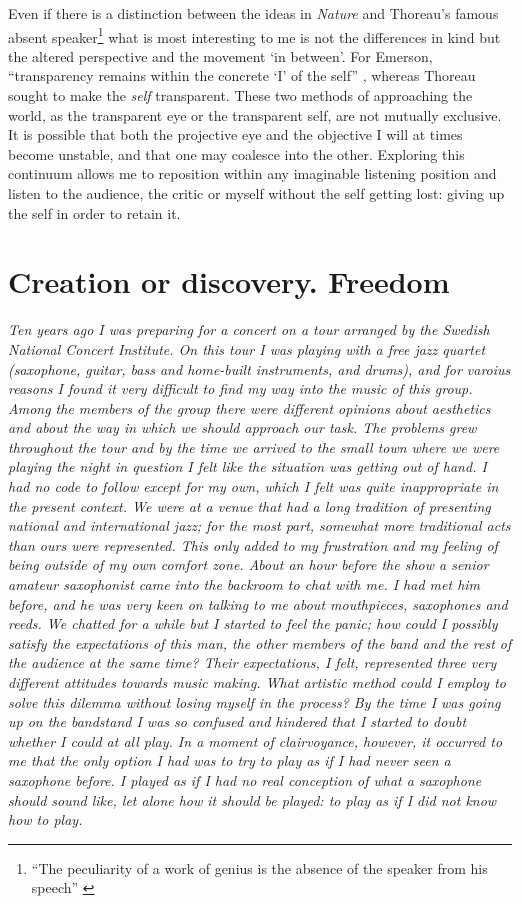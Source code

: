 \documentclass[a4paper]{article}
\begin{document}
Even if there is a distinction between the ideas in \emph{Nature} and Thoreau's famous absent speaker\footnote{``The peculiarity of a work of genius is the absence of the speaker from his speech'' \citep[][p. 264]{thoreau1891}} what is most interesting to me is not the differences in kind but the altered perspective and the movement `in between'. For Emerson, ``transparency remains within the concrete `I' of the self'' \citep[][p. 61]{shultis98}, whereas Thoreau sought to make the \emph{self} transparent. These two methods of approaching the world, as the transparent eye or the transparent self, are not mutually exclusive. It is possible that both the projective eye and the objective I will at times become unstable, and that one may coalesce into the other. Exploring this continuum allows me to reposition within any imaginable listening position and listen to the audience, the critic or myself without the self getting lost: giving up the self in order to retain it. 

\section*{Creation or discovery. Freedom}

\textit{Ten years ago I was preparing for a concert on a tour arranged by the Swedish National Concert Institute. On this tour I was playing with a free jazz quartet (saxophone, guitar, bass and home-built instruments, and drums), and for varoius reasons I found it very difficult to find my way into the music of this group. Among the members of the group there were different opinions about aesthetics and about the way in which we should approach our task. The problems grew throughout the tour and by the time we arrived to the small town where we were playing the night in question I felt like the situation was getting out of hand. I had no code to follow except for my own, which I felt was quite inappropriate in the present context. We were at a venue that had a long tradition of presenting national and international jazz; for the most part, somewhat more traditional acts than ours were represented. This only added to my frustration and my feeling of being outside of my own comfort zone. About an hour before the show a senior amateur saxophonist came into the backroom to chat with me. I had met him before, and he was very keen on talking to me about mouthpieces, saxophones and reeds. We chatted for a while but I started to feel the panic; how could I possibly satisfy the expectations of this man, the other members of the band and the rest of the audience at the same time? Their expectations, I felt, represented three very different attitudes towards music making. What artistic method could I employ to solve this dilemma without losing myself in the process? By the time I was going up on the bandstand I was so confused and hindered that I started to doubt whether I could at all play. In a moment of clairvoyance, however, it occurred to me that the only option I had was to try to play as if I had never seen a saxophone before. I played as if I had no real conception of what a saxophone should sound like, let alone how it should be played: to play as if I did not know how to play.}
\end{document}
